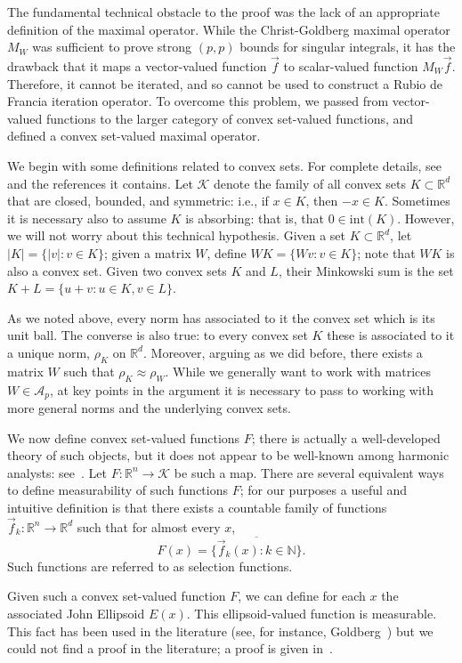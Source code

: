 \documentclass[12pt]{amsart}
\theoremstyle{definition}
\theoremstyle{remark}
\numberwithin{equation}{section}
\newcommand{\N}{\mathbb N}
\newcommand{\rn}{{{\mathbb R}^n}}
\newcommand{\rd}{{{\mathbb R}^d}}
\newcommand{\A}{\mathcal A}
\newcommand{\K}{\mathcal K}
\newcommand{\vecf}{\vec{f}}
\begin{document}
The fundamental technical obstacle to the proof was the lack of an
appropriate definition of the maximal operator.  While the
Christ-Goldberg maximal operator $M_W$ was sufficient to prove strong
$(p,p)$ bounds for singular integrals, it has the drawback that it
maps a vector-valued function $\vecf$ to scalar-valued function
$M_W\vecf$.  Therefore, it cannot be iterated, and so cannot be used
to construct a Rubio de Francia iteration operator.  To overcome this
problem, we passed from vector-valued functions to the larger category
of convex set-valued functions, and defined a convex set-valued
maximal operator.

We begin with some definitions related to convex sets.  For complete
details, see~\cite{mb-2022} and the references it contains.  Let $\K$
denote the family of all convex sets $K\subset \rd$ that are closed,
bounded, and symmetric: i.e., if $x\in K$, then $-x\in K$.  Sometimes
it is necessary also to assume $K$ is absorbing: that is, that $0\in
\mathrm{int}(K)$.  However, we will not worry about this technical
hypothesis.  Given a set $K\subset \rd$, let $|K|=\{ |v| : v \in K
\}$; given a matrix $W$, define $WK= \{ Wv : v \in K\}$; note that
$WK$ is also a convex set.   Given two convex sets $K$ and $L$, their
Minkowski sum is the set $K+L = \{ u+ v : u \in K, v\in L \}$. 

As we noted above, every norm has associated to it the convex set
which is its unit ball.  The converse is also true:  to  every convex
set $K$ these is associated to it a unique
norm, $\rho_K$ on $\rd$.  Moreover, arguing as we did before, there
exists a matrix $W$ such that $\rho_K \approx
\rho_W$.  While we generally want to work with matrices $W\in \A_p$,
at key points in the argument it is necessary to pass to working with
more general norms and the underlying convex sets.

We now define convex set-valued functions $F$; there is actually a
well-developed theory of such objects, but it does not appear to be
well-known among harmonic analysts:  see~\cite{MR2458436,CV}.  Let $F: \rn
\rightarrow \K$ be such a map.  There are several equivalent ways to define
measurability of such functions $F$; for our purposes a useful and
intuitive definition is that there exists a countable family of
functions $\vecf_k : \rn \rightarrow\rd$ such that for almost every $x$,
%
\[ F(x) = \overline{ \{ \vecf_k(x) : k \in \N \} }. \]
%
Such functions are referred to as selection functions.

Given such a convex set-valued function $F$, we can define for each
$x$ the associated John Ellipsoid $E(x)$.  This ellipsoid-valued
function is measurable. This fact has been used in the literature
(see, for instance, Goldberg~\cite{MR2015733}) but we could not find a
proof in the literature; a proof is given in~\cite{mb-2022}.
\end{document}

